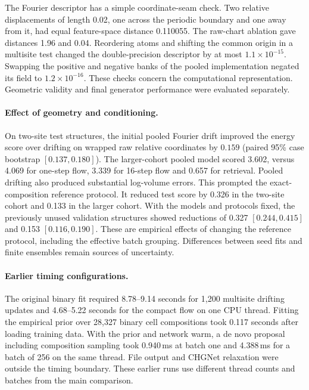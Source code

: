\documentclass[10pt]{article}
\begin{document}
The Fourier descriptor has a simple coordinate-seam check. Two relative displacements of length 0.02, one across the periodic boundary and one away from it, had equal feature-space distance 0.110055. The raw-chart ablation gave distances 1.96 and 0.04. Reordering atoms and shifting the common origin in a multisite test changed the double-precision descriptor by at most $1.1\times10^{-15}$. Swapping the positive and negative banks of the pooled implementation negated its field to $1.2\times10^{-16}$. These checks concern the computational representation. Geometric validity and final generator performance were evaluated separately.

\paragraph{Effect of geometry and conditioning.} On two-site test structures, the initial pooled Fourier drift improved the energy score over drifting on wrapped raw relative coordinates by $0.159$ (paired 95\% case bootstrap $[0.137,0.180]$). The larger-cohort pooled model scored 3.602, versus 4.069 for one-step flow, 3.339 for 16-step flow and 0.657 for retrieval. Pooled drifting also produced substantial log-volume errors. This prompted the exact-composition reference protocol. It reduced test score by 0.326 in the two-site cohort and 0.133 in the larger cohort. With the models and protocols fixed, the previously unused validation structures showed reductions of 0.327 $[0.244,0.415]$ and 0.153 $[0.116,0.190]$. These are empirical effects of changing the reference protocol, including the effective batch grouping. Differences between seed fits and finite ensembles remain sources of uncertainty.

\paragraph{Earlier timing configurations.}
The original binary fit required 8.78--9.14 seconds for 1,200 multisite drifting updates and 4.68--5.22 seconds for the compact flow on one CPU thread. Fitting the empirical prior over 28,327 binary cell compositions took 0.117 seconds after loading training data. With the prior and network warm, a de novo proposal including composition sampling took 0.940\,ms at batch one and 4.388\,ms for a batch of 256 on the same thread. File output and CHGNet relaxation were outside the timing boundary. These earlier runs use different thread counts and batches from the main comparison.
\end{document}
